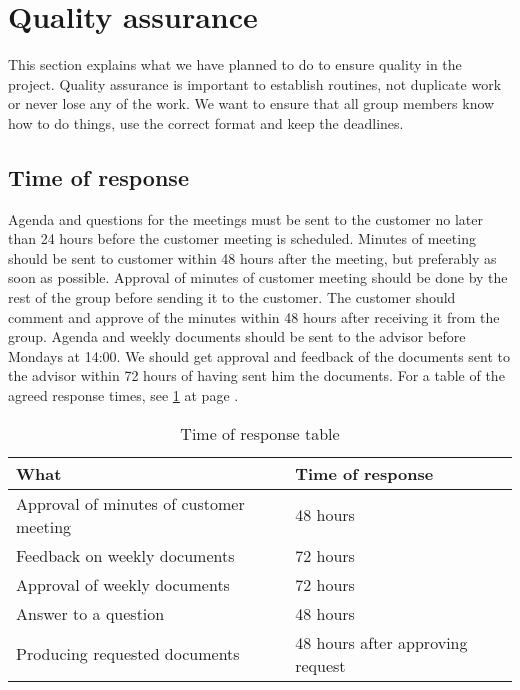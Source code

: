 \section{Quality assurance}
This section explains what we have planned to do to ensure quality in the project. Quality assurance is important to establish routines, not duplicate work or never lose any of the work. We want to ensure that all group members know how to do things, use the correct format and keep the deadlines.

\subsection{Time of response}
Agenda and questions for the meetings must be sent to the customer no later than 24 hours before the customer meeting is scheduled. 
Minutes of meeting should be sent to customer within 48 hours after the meeting, but preferably as soon as possible.
Approval of minutes of customer meeting should be done by the rest of the group before sending it to the customer. 
The customer should comment and approve of the minutes within 48 hours after receiving it from the group. 
Agenda and weekly documents should be sent to the advisor before Mondays at 14:00.
We should get approval and feedback of the documents sent to the advisor within 72 hours of having sent him the documents.
\newline
\newline
For a table of the agreed response times, see \ref{tab:responsetable} at page \pageref{tab:responsetable}.

\begin{table}[hbt]
\begin{center}
\begin{tabular}{l|l} \hline
\textbf{What} & \textbf{Time of response} \\ \hline \hline
Approval of minutes of customer meeting & 48 hours \\
Feedback on weekly documents & 72 hours \\
Approval of weekly documents & 72 hours \\
Answer to a question & 48 hours \\
Producing requested documents & 48 hours after approving request \\ \hline
\end{tabular}
\end{center}
\caption{Time of response table}\label{tab:responsetable}
\end{table}

